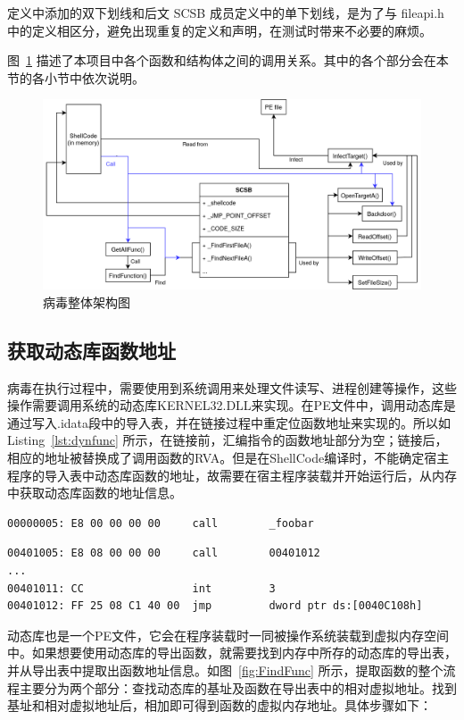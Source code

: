 \documentclass[UTF8]{ctexart}
\begin{document}
    定义中添加的双下划线和后文 SCSB 成员定义中的单下划线，是为了与 fileapi.h 中的定义相区分，避免出现重复的定义和声明，在测试时带来不必要的麻烦。
    
    图~\ref{fig:virus arch} 描述了本项目中各个函数和结构体之间的调用关系。其中的各个部分会在本节的各小节中依次说明。
    
    \begin{figure}[H]
        \centering
        \includegraphics[width=\linewidth]{.asset/pe-virus.png}
        \caption{病毒整体架构图}
        \label{fig:virus arch}
    \end{figure}
	\subsection{获取动态库函数地址}
    病毒在执行过程中，需要使用到系统调用来处理文件读写、进程创建等操作，这些操作需要调用系统的动态库KERNEL32.DLL来实现。在PE文件中，调用动态库是通过写入.idata段中的导入表，并在链接过程中重定位函数地址来实现的。所以如Listing~\ref{lst:dynfunc} 所示，在链接前，汇编指令的函数地址部分为空；链接后，相应的地址被替换成了调用函数的RVA。但是在ShellCode编译时，不能确定宿主程序的导入表中动态库函数的地址，故需要在宿主程序装载并开始运行后，从内存中获取动态库函数的地址信息。

    \begin{lstlisting}
00000005: E8 00 00 00 00     call        _foobar
    \end{lstlisting}
    \begin{lstlisting}[label={lst:dynfunc},caption={链接前（上）和链接后（下）的动态库函数调用},captionpos=b]
00401005: E8 08 00 00 00     call        00401012
...
00401011: CC                 int         3
00401012: FF 25 08 C1 40 00  jmp         dword ptr ds:[0040C108h]
    \end{lstlisting}
    
    动态库也是一个PE文件，它会在程序装载时一同被操作系统装载到虚拟内存空间中。如果想要使用动态库的导出函数，就需要找到内存中所存的动态库的导出表，并从导出表中提取出函数地址信息。如图~\ref{fig:FindFunc} 所示，提取函数的整个流程主要分为两个部分：查找动态库的基址及函数在导出表中的相对虚拟地址。找到基址和相对虚拟地址后，相加即可得到函数的虚拟内存地址。具体步骤如下：
    
\end{document}
